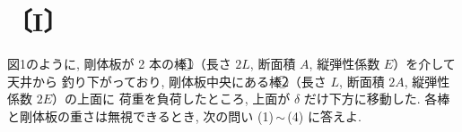 
\section*{〔I〕}

図1のように, 剛体板が 2 本の棒\textcircled{1}（長さ $2L$, 断面積 $A$, 縦弾性係数 $E$）を介して天井から
釣り下がっており, 剛体板中央にある棒\textcircled{2}（長さ $L$, 断面積 $2A$, 縦弾性係数 $2E$）の上面に
荷重を負荷したところ, 上面が $\delta$ だけ下方に移動した. 各棒と剛体板の重さは無視できるとき,
次の問い (1)\,$\sim$\,(4) に答えよ.

